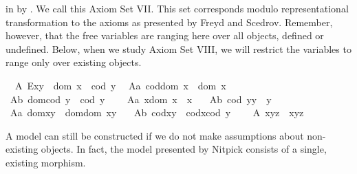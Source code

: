 \begin{isabellebody}
\begin{isamarkuptext}
 in   by  \isa{{\isasymcong}}. We call this Axiom Set VII. This set corresponds
 modulo representational transformation to the axioms as presented by Freyd and Scedrov. Remember, however,
 that the free variables are ranging here over all objects, defined or undefined. Below, when we study
 Axiom Set VIII, we will restrict the variables to range only over existing objects.%
\end{isamarkuptext}\isamarkuptrue%
\ \ A{}{\isacharcolon}\ {\isachardoublequoteopen}E{\isacharparenleft}x{\isasymcdot}y{\isacharparenright}\ \isactrlbold {\isasymleftrightarrow}\ dom\ x\ {\isasymcong}\ cod\ y{\isachardoublequoteclose}\ \isanewline
\ A{}a{\isacharcolon}\ {\isachardoublequoteopen}cod{\isacharparenleft}dom\ x{\isacharparenright}\ {\isasymcong}\ dom\ x\ {\isachardoublequoteclose}\ \ \ \isanewline
\ A{}b{\isacharcolon}\ {\isachardoublequoteopen}dom{\isacharparenleft}cod\ y{\isacharparenright}\ {\isasymcong}\ cod\ y{\isachardoublequoteclose}\ \ \ \isanewline
\ A{}a{\isacharcolon}\ {\isachardoublequoteopen}x{\isasymcdot}{\isacharparenleft}dom\ x{\isacharparenright}\ {\isasymcong}\ x{\isachardoublequoteclose}\ \ \isanewline
\ A{}b{\isacharcolon}\ {\isachardoublequoteopen}{\isacharparenleft}cod\ y{\isacharparenright}{\isasymcdot}y\ {\isasymcong}\ y{\isachardoublequoteclose}\ \ \isanewline
\ A{}a{\isacharcolon}\ {\isachardoublequoteopen}dom{\isacharparenleft}x{\isasymcdot}y{\isacharparenright}\ {\isasymcong}\ dom{\isacharparenleft}{\isacharparenleft}dom\ x{\isacharparenright}{\isasymcdot}y{\isacharparenright}{\isachardoublequoteclose}\ \ \isanewline
\ A{}b{\isacharcolon}\ {\isachardoublequoteopen}cod{\isacharparenleft}x{\isasymcdot}y{\isacharparenright}\ {\isasymcong}\ cod{\isacharparenleft}x{\isasymcdot}{\isacharparenleft}cod\ y{\isacharparenright}{\isacharparenright}{\isachardoublequoteclose}\ \ \isanewline
\ \ A{}{\isacharcolon}\ {\isachardoublequoteopen}x{\isasymcdot}{\isacharparenleft}y{\isasymcdot}z{\isacharparenright}\ {\isasymcong}\ {\isacharparenleft}x{\isasymcdot}y{\isacharparenright}{\isasymcdot}z{\isachardoublequoteclose}%
\begin{isamarkuptext}%
A model can still be constructed if we do not make assumptions about non-existing
  objects. In fact, the model presented by Nitpick consists of a single, existing morphism.%
\end{isamarkuptext}\isamarkuptrue%

\end{isabellebody}
